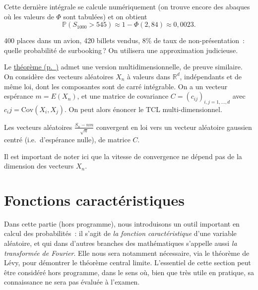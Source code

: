 Cette dernière intégrale se calcule numériquement (on trouve encore des
abaques où les valeurs de \(\Phi\) sont tabulées) et on obtient
\[ \mathbb{P}(S_{1000} > 545) \approx 1 - \Phi(2,84) \approx 0,0023.\]

\label{IV-surbooking}
400 places dans un avion, 420 billets vendus, 8\% de taux de
non-présentation~: quelle probabilité de surbooking\,? On utilisera une
approximation judicieuse.

Le \protect\hyperref[IV-TCL]{théorème (p.~\pageref*{IV-TCL})} admet une
version multidimensionnelle, de preuve similaire. On considère des
vecteurs aléatoires \(X_n\) à valeurs dans \(\mathbb{R}^d\),
indépendants et de même loi, dont les composantes sont de carré
intégrable. On a un vecteur espérance \(m = E(X_n)\), et une matrice de
covariance \(C = (c_{ij} )_{i,j=1,\ldots,d}\) avec
\(c_ij = \text{Cov}(X_i,X_j)\). On peut alors énoncer le TCL
multi-dimensionnel.

\begin{theoreme}\label{IV-central-limite-multi-dimensionnel}

Les vecteurs aléatoires \(\frac{S_n-nm}{\sqrt{n}}\) convergent en loi
vers un vecteur aléatoire gaussien centré (i.e.~d'espérance nulle), de
matrice \(C\).
\end{theoreme}

\begin{remarque}\label{IV-vitesse-de-convergence}

Il est important de noter ici que la vitesse de convergence ne dépend
pas de la dimension des vecteurs \(X_n\).
\end{remarque}

\chapter{Fonctions
caractéristiques}\label{IV-fonctions-caractuxe9ristiques}

Dans cette partie (hors programme), nous introduisons un outil important en calcul des
probabilités~: il s'agit de \emph{la fonction
caractéristique} d'une variable aléatoire, et qui dans d'autres branches
des mathématiques s'appelle aussi \emph{la transformée de Fourier}. Elle
nous sera notamment nécessaire, via le théorème de Lévy, pour démontrer
le théorème central limite. L'essentiel de cette section peut être
considéré hors programme, dans le sens où, bien que très utile en
pratique, sa connaissance ne sera pas évaluée à l'examen.

